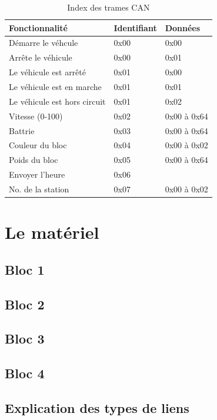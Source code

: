 \documentclass[10pt,a4paper,final]{article}
\begin{document}
\begin{spacing}{1.5}
\begin{table}[!ht]
\caption{Index des trames CAN}
\medskip
\centering
\begin{tabular}{|l|l|l|}
\hline 
\textbf{Fonctionnalité} & \textbf{Identifiant} & \textbf{Données} \\
\hline 
Démarre le véhcule & 0x00 & 0x00 \\ 
\hline 
Arrête le véhicule & 0x00 & 0x01 \\ 
\hline 
Le véhicule est arrêté & 0x01 & 0x00 \\ 
\hline 
Le véhicule est en marche& 0x01 & 0x01 \\ 
\hline 
Le véhicule est hors circuit & 0x01 & 0x02 \\ 
\hline 
Vitesse (0-100) & 0x02 & 0x00 à 0x64 \\ 
\hline 
Battrie & 0x03 & 0x00 à 0x64 \\ 
\hline 
Couleur du bloc & 0x04 & 0x00 à 0x02 \\ 
\hline 
Poids du bloc & 0x05 & 0x00 à 0x64 \\ 
\hline 
Envoyer l'heure & 0x06 &   \\ 
\hline 
No. de la station & 0x07 & 0x00 à 0x02 \\ 
\hline 
\end{tabular} 
\label{tab:testtab1}
\end{table}

\pagebreak
\section{Le matériel}
\subsection{Bloc 1}

\subsection{Bloc 2}

\subsection{Bloc 3}

\subsection{Bloc 4}



\subsection{Explication des types de liens}




\end{spacing}
\end{document}
